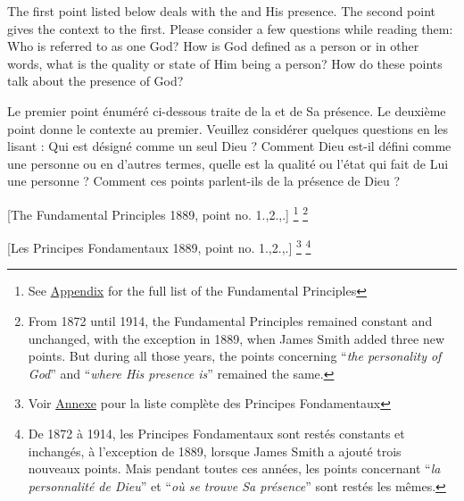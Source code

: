 The first point listed below deals with the  and His presence. The second point gives the context to the first. Please consider a few questions while reading them: Who is referred to as one God? How is God defined as a person or in other words, what is the quality or state of Him being a person? How do these points talk about the presence of God?


Le premier point énuméré ci-dessous traite de la  et de Sa présence. Le deuxième point donne le contexte au premier. Veuillez considérer quelques questions en les lisant : Qui est désigné comme un seul Dieu ? Comment Dieu est-il défini comme une personne ou en d'autres termes, quelle est la qualité ou l'état qui fait de Lui une personne ? Comment ces points parlent-ils de la présence de Dieu ?






[The Fundamental Principles 1889, point no. 1.,2.,.] \footnote{See \hyperref[chap:appendix]{Appendix} for the full list of the Fundamental Principles} \footnote{From 1872 until 1914, the Fundamental Principles remained constant and unchanged, with the exception in 1889, when James Smith added three new points. But during all those years, the points concerning “\textit{the personality of God}” and “\textit{where His presence is}” remained the same. }


[Les Principes Fondamentaux 1889, point no. 1.,2.,.] \footnote{Voir \hyperref[chap:appendix]{Annexe} pour la liste complète des Principes Fondamentaux} \footnote{De 1872 à 1914, les Principes Fondamentaux sont restés constants et inchangés, à l'exception de 1889, lorsque James Smith a ajouté trois nouveaux points. Mais pendant toutes ces années, les points concernant “\textit{la personnalité de Dieu}” et “\textit{où se trouve Sa présence}” sont restés les mêmes. }


